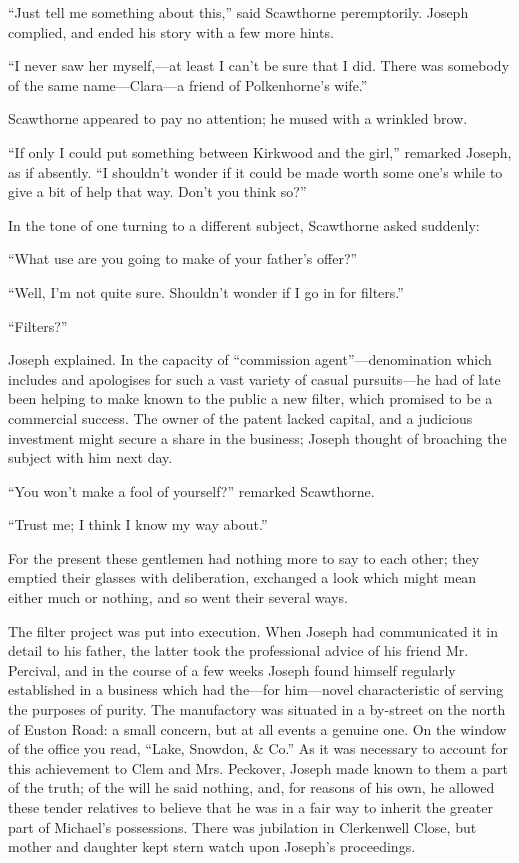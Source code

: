 ``Just tell me something about this,'' said Scawthorne peremptorily.
Joseph complied, and ended his story with a few more hints.

{}``I never saw her myself,---at least I can't be sure that I did. There
was somebody of the same name---Clara---a friend of Polkenhorne's
wife.''

Scawthorne appeared to pay no attention; he mused with a wrinkled brow.

``If only I could put something between Kirkwood and the girl,''
remarked Joseph, as if absently. ``I shouldn't wonder if it could be
made worth some one's while to give a bit of help that way. Don't you
think so?''

In the tone of one turning to a different subject, Scawthorne asked
suddenly:

``What use are you going to make of your father's offer?''

``Well, I'm not quite sure. Shouldn't wonder if I go in for filters.''

``Filters?''

Joseph explained. In the capacity of ``commission agent''---denomination
which includes and apologises for such a vast variety of casual
pursuits---he had of late been helping to make known to the public a new
filter, which promised to be a commercial success. {}The owner of the
patent lacked capital, and a judicious investment might secure a share
in the business; Joseph thought of broaching the subject with him next
day.

``You won't make a fool of yourself?'' remarked Scawthorne.

``Trust me; I think I know my way about.''

For the present these gentlemen had nothing more to say to each other;
they emptied their glasses with deliberation, exchanged a look which
might mean either much or nothing, and so went their several ways.

The filter project was put into execution. When Joseph had communicated
it in detail to his father, the latter took the professional advice of
his friend Mr. Percival, and in the course of a few weeks Joseph found
himself regularly established in a business which had the---for
him---novel characteristic of serving the purposes of purity. The
manufactory was situated in a by-street on the north of Euston Road: a
small concern, but at all events a genuine one. On the window of the
office you read, ``Lake, Snowdon, \& Co.'' As it was necessary to
account for this {}achievement to Clem and Mrs. Peckover, Joseph made
known to them a part of the truth; of the will he said nothing, and, for
reasons of his own, he allowed these tender relatives to believe that he
was in a fair way to inherit the greater part of Michael's possessions.
There was jubilation in Clerkenwell Close, but mother and daughter kept
stern watch upon Joseph's proceedings.

